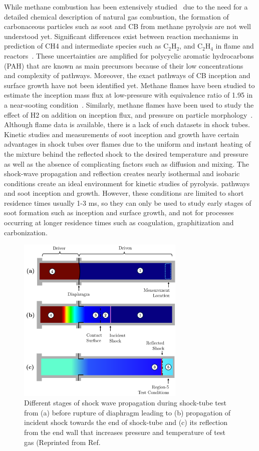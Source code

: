 While methane combustion has been extensively studied~\citep{wang2013pah} due to the need for a detailed chemical description of natural gas combustion, the formation of carbonaceous particles such as soot and CB from methane pyrolysis are not well understood yet. Significant differences exist between reaction mechanisms in prediction of CH4 and intermediate species such as $\mathrm{C_2H_2}$, and $\mathrm{C_2H_4}$ in flame and reactors~\citep{wang2013pah}. These uncertainties are amplified for polycyclic aromatic hydrocarbons (PAH) that are known as main precursors because of their low concentrations and complexity of pathways. Moreover, the exact pathways of CB inception and surface growth have not been identified yet. 
Methane flames have been studied to estimate the inception mass flux at low-pressure with equivalence ratio of 1.95 in a near-sooting condition~\citep{desgroux2017comparative}. Similarly, methane flames have been used to study the effect of H2 on addition on inception flux, and pressure on particle morphology~\citep{amin2020morphology}. Although flame data is available, there is a lack of such datasets in shock tubes. Kinetic studies and measurements of soot inception and growth have certain advantages in shock tubes over flames due to the uniform and instant heating of the mixture behind the reflected shock to the desired temperature and pressure as well as the absence of complicating factors such as diffusion and mixing. The shock-wave propagation and reflection creates nearly isothermal and isobaric conditions create an ideal environment for kinetic studies of pyrolysis. pathways and soot inception and growth. However, these conditions are limited to short residence times usually 1-3 ms, so they can only be used to study early stages of soot formation such as inception and surface growth, and not for processes occurring at longer residence times such as coagulation, graphitization and carbonization.

\begin{figure}[!htbp]
	\centering
	\includegraphics[height=80mm, ]{Figures/Results/Shocktube/shockwavestages.pdf}
	\caption{Different stages of shock wave propagation during shock-tube test from (a) before rupture of diaphragm leading to (b) propagation of incident shock towards the end of shock-tube and (c) its reflection from the end wall that increases pressure and temperature of test gas (Reprinted from Ref.~\citep{HansonGroupShockTube}}
	\label{fig:shockwave}
\end{figure}


